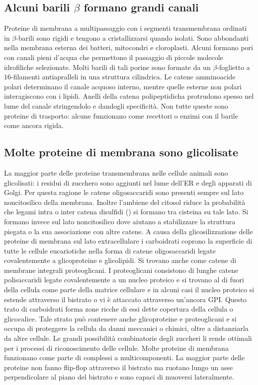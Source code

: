 \subsection{Alcuni barili $\beta$ formano grandi canali}
Proteine di membrana a multipassaggio con i segmenti transmembrana ordinati in $\beta$-barili sono rigidi e tengono a cristallizzarsi quando isolati. Sono abbondanti nella membrana 
esterna dei batteri, mitocondri e cloroplasti. Alcuni formano pori con canali pieni d'acqua che permettono il passaggio di piccole molecole idrofiliche selezionate. Molti barili di tali
porine sono formate da un $\beta$-foglietto a $16$-filamenti antiapralleli in una struttura cilindrica. Le catene amminoacide polari determinano il canale acquoso interno, mentre quelle
esterne non polari interagiscono con i lipidi. Anelli della catena polipeptidicha protrudono spesso nel lume del canale stringendolo e dandogli specificit\`a. Non tutte queste sono
proteine di trasporto: alcune funzionano come recettori o enzimi con il barile come ancora rigida. 
\subsection{Molte proteine di membrana sono glicolisate}
La maggior parte delle proteine transmembrana nelle cellule animali sono glicolisati: i residui di zucchero sono aggiunti nel lume dell'ER e degli apparati di Golgi. Per questa ragione
le catene oligosaccaridi sono presenti sempre sul lato noncitosilico della membrana. Inoltre l'ambiene del citosol riduce la probabilit\`a che legami intra o inter catena disulfidi 
() si formano tra cisteina su tale lato. Si formano invece sul lato noncitosilico dove aiutano a stabilizzare la struttura piegata o la sua associazione con altre catene. A 
causa della glicosilizzazione delle proteine di membrana sul lato extracellulare i carboidrati coprono la superficie di tutte le cellule eucariotiche nella forma di catene oligosaccaridi
legate covalentemente a glicoproteine e glicolipidi. Si trovano anche come catene di membrane integrali proteoglicani. I proteoglicani consistono di lunghe catene polisaccaridi legate
covalentemente a un nucleo proteico e si trovano al di fuori della cellula come parte della matrice cellulare e in alcuni casi il nucleo proteico si estende attraverso il bistrato o vi
\`e attaccato attraverso un'ancora GPI. Questo trato di carboidrati forma zone ricche di essi dette copertura della cellula o glicocalice. Tale strato pu\`o contenere anche glicoproteine
e proteoglicani e si occupa di proteggere la cellula da danni meccanici o chimici, oltre a distanziarla da altre cellule. Le grandi possibilit\`a combinatorie degli zuccheri li rende
ottimali per i processi di riconoscimento delle cellule. Molte proteine di membrana funzionano come parte di complessi a multicomponenti. La maggior parte delle proteine non fanno 
flip-flop attraverso il bistrato ma ruotano lungo un asse perpendicolare al piano del bistrato e sono capaci di muoversi lateralmente.
